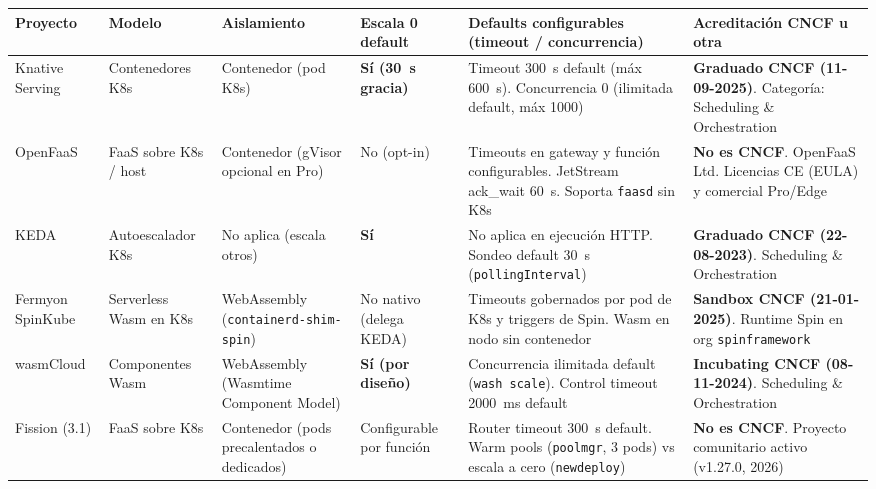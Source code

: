 \documentclass[12pt, letterpaper, table, xcdraw]{inf-pucv}
\begin{document}
{\scriptsize
\setlength{\tabcolsep}{3pt}
\begin{longtable}{|p{2.3cm}|p{2.4cm}|p{2.2cm}|p{1.3cm}|p{3.6cm}|p{2.7cm}|}
\hline
\textbf{Proyecto} & \textbf{Modelo} & \textbf{Aislamiento} & \textbf{Escala 0 default} & \textbf{Defaults configurables (timeout / concurrencia)} & \textbf{Acreditación CNCF u otra} \\ \hline
\endhead

Knative Serving & Contenedores K8s & Contenedor (pod K8s) & \textbf{Sí (30~s gracia)} & Timeout 300~s default (máx 600~s). Concurrencia 0 (ilimitada default, máx 1000) & \textbf{Graduado CNCF (11-09-2025)}. Categoría: Scheduling \& Orchestration \\ \hline

OpenFaaS & FaaS sobre K8s / host & Contenedor (gVisor opcional en Pro) & No (opt-in) & Timeouts en gateway y función configurables. JetStream ack\_wait 60~s. Soporta \texttt{faasd} sin K8s & \textbf{No es CNCF}. OpenFaaS Ltd. Licencias CE (EULA) y comercial Pro/Edge \\ \hline

KEDA & Autoescalador K8s & No aplica (escala otros) & \textbf{Sí} & No aplica en ejecución HTTP. Sondeo default 30~s (\texttt{pollingInterval}) & \textbf{Graduado CNCF (22-08-2023)}. Scheduling \& Orchestration \\ \hline

Fermyon SpinKube & Serverless Wasm en K8s & WebAssembly (\texttt{containerd-shim-spin}) & No nativo (delega KEDA) & Timeouts gobernados por pod de K8s y triggers de Spin. Wasm en nodo sin contenedor & \textbf{Sandbox CNCF (21-01-2025)}. Runtime Spin en org \texttt{spinframework} \\ \hline

wasmCloud & Componentes Wasm & WebAssembly (Wasmtime Component Model) & \textbf{Sí (por diseño)} & Concurrencia ilimitada default (\texttt{wash scale}). Control timeout 2000~ms default & \textbf{Incubating CNCF (08-11-2024)}. Scheduling \& Orchestration \\ \hline

Fission (3.1) & FaaS sobre K8s & Contenedor (pods precalentados o dedicados) & Configurable por función & Router timeout 300~s default. Warm pools (\texttt{poolmgr}, 3 pods) vs escala a cero (\texttt{newdeploy}) & \textbf{No es CNCF}. Proyecto comunitario activo (v1.27.0, 2026) \\ \hline
\end{longtable}
}
\end{document}

